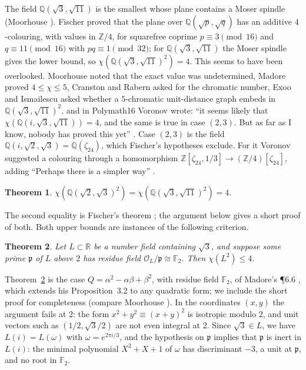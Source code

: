 \documentclass[11pt,a4paper]{amsart}
\newtheorem{theorem}{Theorem}
\theoremstyle{remark}
\newcommand{\F}{\mathbb{F}}
\newcommand{\Q}{\mathbb{Q}}
\newcommand{\R}{\mathbb{R}}
\newcommand{\Z}{\mathbb{Z}}
\newcommand{\p}{\mathfrak{p}}
\begin{document}
The field $\Q(\sqrt3,\sqrt{11})$ is the smallest whose plane contains a Moser spindle \cite{Moser} (Moorhouse
\cite[Prop.~1.4]{Moorhouse}). Fischer
\cite{Fischer1994} proved that the plane over $\Q(\sqrt p,\sqrt q)$ has an additive $4$-colouring, with values in
$\Z/4$, for squarefree coprime $p\equiv3\pmod{16}$ and $q\equiv11\pmod{16}$ with $pq\equiv1\pmod{32}$; for
$\Q(\sqrt3,\sqrt{11})$ the Moser spindle gives the lower bound, so $\chi(\Q(\sqrt3,\sqrt{11})^2)=4$. This seems
to have been overlooked. Moorhouse \cite{Moorhouse} noted that the exact value was undetermined, Madore
\cite{Madore} proved $4\le\chi\le5$, Cranston and Rabern \cite{CranstonRabern} asked for the chromatic number,
Exoo and Ismailescu \cite{ExooIsmailescu} asked whether a $5$-chromatic unit-distance graph embeds in
$\Q(\sqrt3,\sqrt{11})^2$, and in Polymath16 Voronov wrote: ``it seems likely that
$\chi(\Q(i,\sqrt3,\sqrt{11}))=4$, and the same is true in case $(2,3)$. But as far as I know, nobody has proved
this yet'' \cite{Polymath17}. Case $(2,3)$ is the field $\Q(i,\sqrt2,\sqrt3)=\Q(\zeta_{24})$, which Fischer's
hypotheses exclude. For it Voronov suggested a colouring through a homomorphism
$\Z[\zeta_{24},1/3]\to(\Z/4)[\zeta_{24}]$, adding ``Perhaps there is a simpler way'' \cite{Polymath17}.

\begin{theorem}\label{thm:main}
$\chi(\Q(\sqrt2,\sqrt3)^2)=\chi(\Q(\sqrt3,\sqrt{11})^2)=4$.
\end{theorem}

The second equality is Fischer's theorem \cite{Fischer1994}; the argument below gives a short proof of both.
Both upper bounds are instances of the following criterion.

\begin{theorem}\label{thm:criterion}
Let $L\subset\R$ be a number field containing $\sqrt3$, and suppose some prime $\p$ of $L$ above $2$ has residue
field $\mathcal{O}_L/\p\cong\F_2$. Then $\chi(L^2)\le4$.
\end{theorem}

Theorem~\ref{thm:criterion} is the case $Q=\alpha^2-\alpha\beta+\beta^2$, with residue field $\F_2$, of Madore's
\P6.6 \cite{Madore}, which extends his Proposition~3.2 to any quadratic form; we include the short proof for
completeness (compare Moorhouse \cite[Lemma~4.2 and Theorem~7.1]{Moorhouse}). In the coordinates $(x,y)$ the
argument fails at $2$: the form $x^2+y^2\equiv(x+y)^2$ is isotropic modulo $2$, and unit vectors such as
$(1/2,\sqrt3/2)$ are not even integral at $2$. Since $\sqrt3\in L$, we have $L(i)=L(\omega)$ with
$\omega=e^{2\pi i/3}$, and the hypothesis on $\p$ implies that $\p$ is inert in $L(i)$: the minimal polynomial
$X^2+X+1$ of $\omega$ has discriminant $-3$, a unit at $\p$, and no root in $\F_2$.
\end{document}
